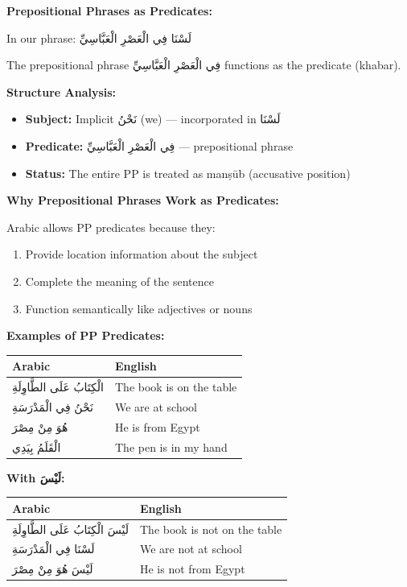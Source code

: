 \documentclass[letterpaper,12pt]{article}
\begin{document}
\begin{tcolorbox}[colback=white,colframe=accentcolor,breakable]
\textbf{Prepositional Phrases as Predicates:}

In our phrase: \textarabic{لَسْنَا فِي الْعَصْرِ الْعَبَّاسِيِّ}

The prepositional phrase \textarabic{فِي الْعَصْرِ الْعَبَّاسِيِّ} functions as the predicate (khabar).

\textbf{Structure Analysis:}
\begin{itemize}
\item \textbf{Subject:} Implicit \textarabic{نَحْنُ} (we) — incorporated in \textarabic{لَسْنَا}
\item \textbf{Predicate:} \textarabic{فِي الْعَصْرِ الْعَبَّاسِيِّ} — prepositional phrase
\item \textbf{Status:} The entire PP is treated as manṣūb (accusative position)
\end{itemize}

\textbf{Why Prepositional Phrases Work as Predicates:}

Arabic allows PP predicates because they:
\begin{enumerate}
\item Provide location information about the subject
\item Complete the meaning of the sentence
\item Function semantically like adjectives or nouns
\end{enumerate}

\textbf{Examples of PP Predicates:}

\begin{tabular}{|l|l|}
\hline
\textbf{Arabic} & \textbf{English} \\
\hline
\textarabic{الْكِتَابُ عَلَى الطَّاوِلَةِ} & The book is on the table \\
\hline
\textarabic{نَحْنُ فِي الْمَدْرَسَةِ} & We are at school \\
\hline
\textarabic{هُوَ مِنْ مِصْرَ} & He is from Egypt \\
\hline
\textarabic{الْقَلَمُ بِيَدِي} & The pen is in my hand \\
\hline
\end{tabular}

\textbf{With \textarabic{لَيْسَ}:}

\begin{tabular}{|l|l|}
\hline
\textbf{Arabic} & \textbf{English} \\
\hline
\textarabic{لَيْسَ الْكِتَابُ عَلَى الطَّاوِلَةِ} & The book is not on the table \\
\hline
\textarabic{لَسْنَا فِي الْمَدْرَسَةِ} & We are not at school \\
\hline
\textarabic{لَيْسَ هُوَ مِنْ مِصْرَ} & He is not from Egypt \\
\hline
\end{tabular}
\end{tcolorbox}
\end{document}
